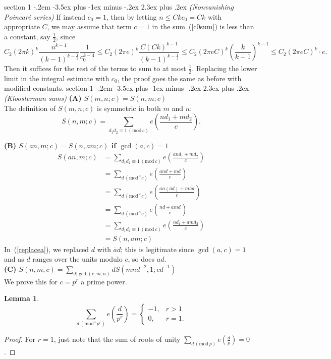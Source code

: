 \documentclass[12pt]{article}
\makeatletter
\theoremstyle{norm}
\newtheorem{lem}[thm]{Lemma}
\newcommand{\rc}[1]{\frac{1}{#1}}
\newcommand{\pa}[1]{\left( {#1} \right)}
\newcommand{\subprob}[1]{\noindent\textbf{#1}\\}
\newcommand{\pf}[2]{\pa{\frac{#1}{#2}}}
\newcommand{\ol}[1]{\overline{#1}}
\newcommand{\mmod}[1]{\,(\text{mod}^{\times} #1)}
\newcommand{\nmod}[1]{\,(\text{mod}\, #1)}
\newenvironment{problem}{\@startsection
       {section}
       {1}
       {-.2em}
       {-3.5ex plus -1ex minus -.2ex}
       {2.3ex plus .2ex}
       {\pagebreak[3]%
       \large\bf\noindent{Problem }
       }
       }
       {%
       }
\makeatother
\begin{document}
\begin{problem}{\it (Nonvanishing Poincar\'e series)}
If instead $c_0=1$, then by letting $n\leq Ckc_0=Ck$ with appropriate $C$, we may assume that term $c=1$ in the sum~(\ref{c0sum}) is less than a constant, say $\rc 2$, since
\[
C_2(2\pi k)^k\frac{n^{k-1}}{(k-1)^{k-\rc2}}\rc{c_0^{k-4}}\leq C_2(2\pi e)^k \frac{C(Ck)^{k-1}}{(k-1)^{k-\rc 2}}\leq C_2(2\pi eC)^k \pf{k}{k-1}^{k-1}
\leq C_2(2\pi eC)^k\cdot e.
\]
Then it suffices for the rest of the terms to sum to at most $\rc 2$. Replacing the lower limit in the integral estimate with $c_0$, the proof goes the same as before with modified constants.
\end{problem}
\begin{problem}{\it (Kloosterman sums)}
\subprob{(A) $S(m,n;c)=S(n,m;c)$}
The definition of $S(m,n;c)$ is symmetric in both $m$ and $n$:
\[
S(n,m;c)=\sum_{d_1d_2\equiv 1\nmod{c}} e\pf{nd_1+md_2}{c}.
\]

\subprob{(B) $S(an,m;c)=S(n,am;c)$ if $\gcd(a,c)=1$}
\begin{align}
\nonumber S(an,m;c)&=\sum_{d_1d_2\equiv 1\nmod{c}}e\pf{and_1+md_2}{c}\\
\nonumber &=\sum_{d\mmod{c}}e\pf{and+m\ol{d}}{c}\\
&=\sum_{d\mmod{c}}e\pf{an(\ol{a}d)+m\ol{\ol{a}d}}{c}
\label{replacea}\\
\nonumber &=\sum_{d\mmod{c}}e\pf{nd+am\ol{d}}{c}\\
\nonumber &=\sum_{d_1d_2\equiv 1\nmod{c}}e\pf{nd_1+amd_2}{c}\\
\nonumber &=S(n,am;c)
\end{align}
In~(\ref{replacea}), we replaced $d$ with $\ol{a}d$; this is legitimate since $\gcd(a,c)=1$ and as $d$ ranges over the units modulo $c$, so does $\ol{a}d$.\\

\subprob{(C) $S(n,m,c)=\sum_{d|\gcd(c,m,n)} dS(mnd^{-2},1;cd^{-1})$}
We prove this for $c=p^r$ a prime power.
\begin{lem}\label{rpsum}
\[\sum_{d\mmod{p^r}} e\pf{d}{p^r}=\begin{cases}
-1,&r>1\\
0,&r=1.
\end{cases}
\]
\end{lem}
\begin{proof}
For $r=1$, just note that the sum of roots of unity $\sum_{d\nmod p}e\pf{d}{p}=0$. 


\end{proof}
\end{problem}
\end{document}
